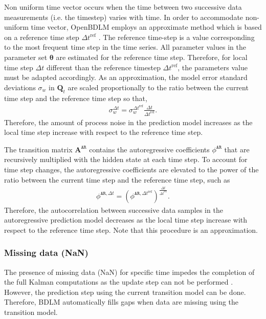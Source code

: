 Non uniform time vector occurs when the time between two successive data measurements (i.e. the timestep) varies with time.
In order to accommodate non-uniform time vector, OpenBDLM employs an approximate method which is based on a reference time step $\Delta t^{\text{ref}} $ \cite{STC:STC2035}. 
The reference time-step is a value corresponding to the most frequent time step in the time series.
All parameter values in the parameter set $\bm \theta$ are estimated for the reference time step. 
Therefore, for local time step $\Delta t$ different than the reference timestep $\Delta t^{\text{ref}} $, the parameters value must be adapted accordingly.
As an approximation, the model error standard deviations  $\sigma_{w}$ in $\mathbf{Q}_{t}$ are scaled proportionally to the ratio between the current time step and the reference time step so that,
\begin{gather*}
\sigma_{w}^{\Delta t}= \sigma_{w}^{\Delta t ^{\text{ref}}}\frac{\Delta t}{\Delta t ^{\text{ref}}}.
\end{gather*}
Therefore, the amount of process noise in the prediction model increases as the local time step increase with respect to the reference time step.

The transition matrix $\mathbf{A}^{\mathtt{AR}}$ contains the autoregressive coefficients $\phi^{\mathtt{AR}}$ that are recursively multiplied with the hidden state at each time step. 
To account for time step changes, the autoregressive coefficients are elevated to the power of the ratio between the current time step and the reference time step, such as
\begin{gather*}
\phi^{\mathtt{AR}, \Delta t}=  (\phi^{\mathtt{AR}, \Delta t ^{\text{ref}}})^{\frac{\Delta t}{\Delta t ^{\text{ref}}}}.
\end{gather*}
Therefore, the autocorrelation between successive data samples in the autoregressive prediction model decreases as the local time step increase with respect to the reference time step.
Note that this procedure is an approximation.
\subsubsection{Missing data (NaN)}

The presence of missing data (NaN) for specific time impedes the completion of the full Kalman computations as the update step can not be performed \cite{STC:STC2035}.
However, the prediction step using the current transition model can be done.
Therefore, BDLM automatically fills gaps when data are missing using the transition model.


